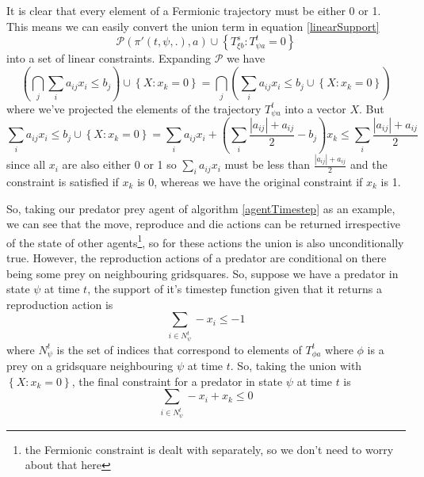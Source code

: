 It is clear that every element of a Fermionic trajectory must be either 0 or 1. This means we can easily convert the union term in equation \ref{linearSupport} 
\[
\mathcal{P}(\pi'(t,\psi,.), a) \cup \left\{T^s_{\xi b}: T^t_{\psi a} = 0\right\}
\]
into a set of linear constraints. Expanding $\mathcal{P}$ we have
\[
\left(\bigcap_j \sum_i a_{ij}x_i \le b_j \right) \cup \left\{X: x_k = 0\right\} = \bigcap_j \left( \sum_i a_{ij}x_i \le b_j  \cup \left\{X: x_k = 0\right\}\right)
\]
where we've projected the elements of the trajectory $T^t_{\psi a}$ into a vector $X$. But
\[
\sum_i a_{ij}x_i \le b_j  \cup \left\{X: x_k = 0\right\} = \sum_i a_{ij}x_i + \left(\sum_i \frac{|a_{ij}| + a_{ij}}{2} - b_j\right)x_k \le \sum_i \frac{|a_{ij}| + a_{ij}}{2} 
\]
since all $x_i$ are also either 0 or 1 so $\sum_i a_{ij}x_i$ must be less than $\frac{|a_{ij}| + a_{ij}}{2}$ and the constraint is satisfied if $x_k$ is 0, whereas we have the original constraint if $x_k$ is 1.

So, taking our predator prey agent of algorithm \ref{agentTimestep} as an example, we can see that the move, reproduce and die actions can be returned irrespective of the state of other agents\footnote{the Fermionic constraint is dealt with separately, so we don't need to worry about that here}, so for these actions the union is also unconditionally true. However, the reproduction actions of a predator are conditional on there being some prey on neighbouring gridsquares. So, suppose we have a predator in state $\psi$ at time $t$, the support of it's timestep function given that it returns a reproduction action is
\[
\sum_{i \in N^t_\psi} -x_i \le -1
\]
where $N^t_\psi$ is the set of indices that correspond to elements of $T^t_{\phi a}$ where $\phi$ is a prey on a gridsquare neighbouring $\psi$ at time $t$. So, taking the union with $\left\{X: x_k = 0\right\}$, the final constraint for a predator in state $\psi$ at time $t$ is
\[
\sum_{i \in N^t_\psi} -x_i  + x_k  \le 0
\]

